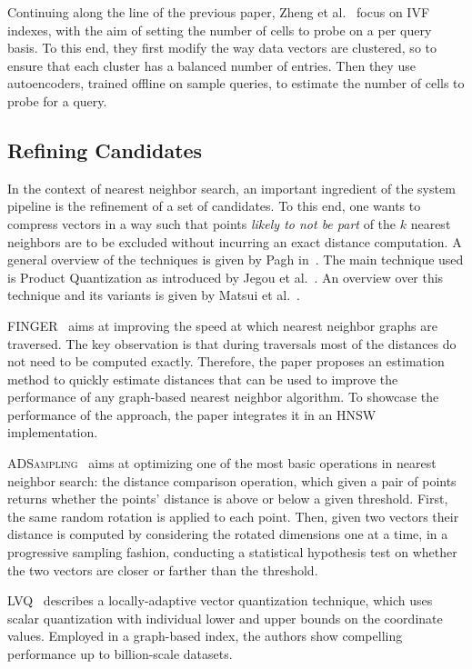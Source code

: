 \documentclass[11pt]{article}
\begin{document}
Continuing along the line of the previous paper, Zheng et
al.~\cite{DBLP:conf/icde/ZhengYHYLX0J23} focus on IVF indexes, with the aim of
setting the number of cells to probe on a per query basis. To this end, they
first modify the way data vectors are clustered, so to ensure that each cluster
has a balanced number of entries. Then they use autoencoders, trained offline
on sample queries, to estimate the number of cells to probe for a query.

\subsection{Refining Candidates}

In the context of nearest neighbor search, an important ingredient of the system pipeline is the refinement of a set of candidates.
To this end, one wants to compress vectors in a way such that points \emph{likely to not be part} of the $k$ nearest neighbors are to be excluded without incurring an exact distance computation.
A general overview of the techniques is given by Pagh in~\cite{DBLP:reference/bdt/Pagh19}.
The main technique used is Product Quantization as introduced by Jegou et al.~\cite{DBLP:journals/pami/JegouDS11}.
An overview over this technique and its variants is given by Matsui et al.~\cite{matsui2018survey}.

\textsc{FINGER}~\cite{DBLP:conf/www/ChenCJYDH23} aims at improving the speed
at which nearest neighbor graphs are traversed. The key observation is that
during traversals most of the distances do not need to be computed exactly.
Therefore, the paper proposes an estimation method to quickly estimate distances
that can be used to improve the performance of any graph-based nearest
neighbor algorithm. To showcase the performance of the approach, the paper
integrates it in an HNSW implementation.

\textsc{ADSampling}~\cite{DBLP:journals/pacmmod/GaoL23} aims at optimizing one
of the most basic operations in nearest neighbor search: the distance
comparison operation, which given a pair of points returns whether the points'
distance is above or below a given threshold. First, the same random rotation
is applied to each point. Then, given two vectors their distance is computed by
considering the rotated dimensions one at a time, in a progressive sampling
fashion, conducting a statistical hypothesis test on whether the two vectors
are closer or farther than the threshold.

\textsc{LVQ}~\cite{AuguerrebereBSHT23} describes a locally-adaptive vector quantization technique, which uses scalar quantization with individual lower and upper bounds on the coordinate values.
Employed in a graph-based index, the authors show compelling performance up to billion-scale datasets.
\end{document}
